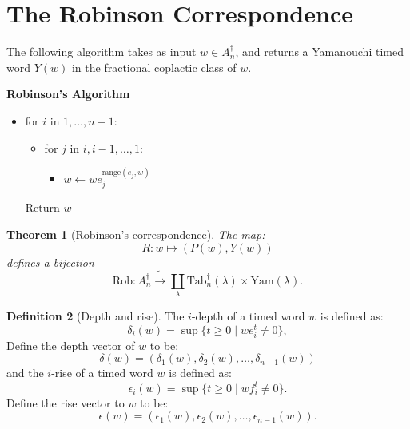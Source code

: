 \documentclass[12pt]{amsproc}
\newcommand{\Yam}{\mathrm{Yam}}
\newcommand{\Rob}{\mathrm{Rob}}
\newcommand{\range}{\mathrm{range}}
\newcommand{\ot}{\leftarrow}
\newcommand{\Tab}{\mathrm{Tab}}
\newtheorem{theorem}{Theorem}
\theoremstyle{definition}
\newtheorem{definition}[theorem]{Definition}
\begin{document}
\section{The Robinson Correspondence}
\label{sec:rob}
The following algorithm takes as input $w\in A_n^\dagger$, and returns a Yamanouchi timed word $Y(w)$ in the fractional coplactic class of $w$.
\begin{center}
  \textbf{Robinson's Algorithm}
\end{center}
\begin{itemize}
\item for $i$ in $1,\dotsc,n-1$:
  \begin{itemize}
  \item for $j$ in $i, i-1,\dotsc,1$:
    \begin{itemize}
    \item $w\ot w e_j^{\range(e_j,w)}$
    \end{itemize}
  \end{itemize}
  Return $w$
\end{itemize}
\begin{theorem}
  [Robinson's correspondence]
  The map:
  \begin{displaymath}
    R:w\mapsto (P(w),Y(w)) 
  \end{displaymath}
  defines a bijection
  \begin{displaymath}
    \Rob: A_n^\dagger \tilde\to \coprod_\lambda \Tab^\dagger_n(\lambda)\times \Yam(\lambda).
  \end{displaymath}
\end{theorem}
\begin{definition}
  [Depth and rise]
  The $i$-depth of a timed word $w$ is defined as:
  \begin{displaymath}
    \delta_i(w)=\sup\{t\geq 0\mid we_i^t\neq 0\},
  \end{displaymath}
  Define the depth vector of $w$ to be:
  \begin{displaymath}
    \delta(w) = (\delta_1(w),\delta_2(w),\dotsc,\delta_{n-1}(w))
  \end{displaymath}
  and the $i$-rise of a timed word $w$ is defined as:
  \begin{displaymath}
    \epsilon_i(w) = \sup\{t\geq 0\mid wf_i^t\neq 0\}.
  \end{displaymath}
  Define the rise vector to $w$ to be:
  \begin{displaymath}
    \epsilon(w) = (\epsilon_1(w),\epsilon_2(w),\dotsc,\epsilon_{n-1}(w)).
  \end{displaymath}
\end{definition}
\end{document}

